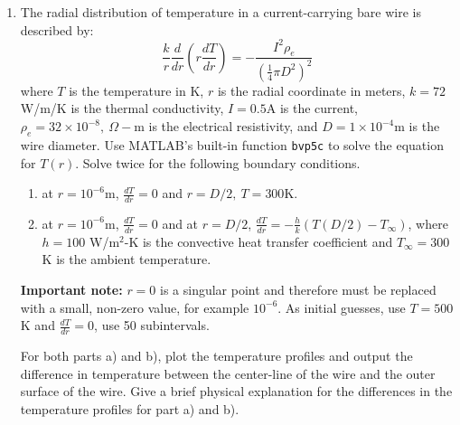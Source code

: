 \begin{fullwidth}
\begin{enumerate}
\begin{enumerate}
\end{enumerate}

\pagebreak

\item The radial distribution of temperature in a current-carrying bare wire is described by:
\begin{equation*}
\frac{k}{r}\frac{d}{dr}\left(r \frac{dT}{dr}\right)=-\frac{I^2 \rho_e}{\left(\frac{1}{4}\pi D^2 \right)^2}
\end{equation*}
where $T$ is the temperature in K, $r$ is the radial coordinate in meters, $k=72$ W/m/K is the thermal conductivity, $I=0.5$A is the current, $\rho_e=32\times 10^{-8}, \ \Omega-$m is the electrical resistivity, and $D=1 \times 10^{-4}$m is the wire diameter. Use MATLAB's built-in function \lstinline[style=myMatlab]{bvp5c} to solve the equation for $T(r)$.  Solve twice for the following boundary conditions.
\begin{enumerate}
\item at $r=10^{-6}$m, $\frac{dT}{dr}=0$ and $r= D/2, \ T=300$K.
\item at $r=10^{-6}$m, $\frac{dT}{dr}=0$ and at $r=D/2$, $\frac{dT}{dr}=-\frac{h}{k}\left(T(D/2)-T_{\infty}\right)$, where $h=100$ W/m$^{2}$-K is the convective heat transfer coefficient and $T_{\infty}=300$K is the ambient temperature.
\end{enumerate}

\vspace{0.25cm}

\noindent \textbf{Important note:} $r=0$ is a singular point and therefore must be replaced with a small, non-zero value, for example $10^{-6}$.  As initial guesses, use $T=500$K and $\frac{dT}{dr}=0$, use 50 subintervals.

\vspace{0.25cm}

\noindent For both parts a) and b), plot the temperature profiles and output the difference in temperature between the center-line of the wire and the outer surface of the wire.  Give a brief physical explanation for the differences in the temperature profiles for part a) and b).  

\end{enumerate}



\end{fullwidth}
